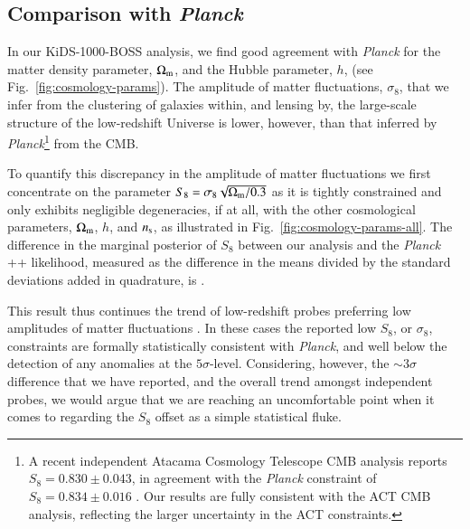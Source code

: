 \subsection{Comparison with {\it Planck}}
\label{sec:planck_comp}
In our KiDS-1000-BOSS \tttp analysis, we find good agreement with {\it Planck} for the matter density parameter, $\Omega_{\rm m}$, and the Hubble parameter, $h$, (see Fig.~\ref{fig:cosmology-params}).
The amplitude of matter fluctuations, $\sigma_8$, that we infer from the clustering of galaxies within, and lensing by, the large-scale structure of the low-redshift Universe is lower, however, than that inferred by {\it Planck}\footnote{A recent independent Atacama Cosmology Telescope CMB analysis reports $S_8=0.830 \pm 0.043$, in agreement with the {\it Planck} constraint of $S_8=0.834 \pm 0.016$ \citep[ACT,][]{aiola/etal:2020}.   Our results are fully consistent with the ACT CMB analysis, reflecting the larger uncertainty in the ACT constraints.} from the CMB. 

To quantify this discrepancy in the amplitude of matter fluctuations we first concentrate on the parameter $S_{8} = \sigma_8 \sqrt{\Omega_{\rm m}/0.3}$ as it is tightly constrained and only exhibits negligible degeneracies, if at all, with the other cosmological parameters, $\Omega_{\rm m}$, $h$, and $n_{\rm s}$, as illustrated in Fig.~\ref{fig:cosmology-params-all}. 
%
The difference in the marginal posterior of $S_{8}$ between our \tttp analysis and the {\it Planck} ++ likelihood, measured as the difference in the means divided by the standard deviations added in quadrature, is \kpoff.

This result thus continues the trend of low-redshift probes preferring low amplitudes of matter fluctuations \citep{heymans/etal:2013, alam/etal:2017, abbott/etal:2018, hikage/etal:2019, bocquet/etal:2019, wright/etal:2020b,DESclusters/etal:2020}. 
In these cases the reported low $S_8$, or $\sigma_8$, constraints are formally statistically consistent with {\it Planck}, and well below the detection of any anomalies at the $5\sigma$-level. 
Considering, however, the $\sim 3\sigma$ difference that we have reported, and the overall trend amongst independent probes, we would argue that we are reaching an uncomfortable point when it comes to regarding the $S_8$ offset as a simple statistical fluke.

